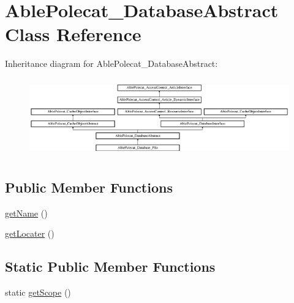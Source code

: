 \hypertarget{class_able_polecat___database_abstract}{}\section{Able\+Polecat\+\_\+\+Database\+Abstract Class Reference}
\label{class_able_polecat___database_abstract}
Inheritance diagram for Able\+Polecat\+\_\+\+Database\+Abstract\+:\begin{figure}[H]
\begin{center}
\leavevmode
\includegraphics[height=3.414634cm]{class_able_polecat___database_abstract}
\end{center}
\end{figure}
\subsection*{Public Member Functions}
\begin{DoxyCompactItemize}
\item 
\hyperlink{class_able_polecat___database_abstract_a3d0963e68bb313b163a73f2803c64600}{get\+Name} ()
\item 
\hyperlink{class_able_polecat___database_abstract_a66e49cc03d1511ec4c0290ffaa688079}{get\+Locater} ()
\end{DoxyCompactItemize}
\subsection*{Static Public Member Functions}
\begin{DoxyCompactItemize}
\item 
static \hyperlink{class_able_polecat___database_abstract_ad9ade868bd136d32967059d1cccb3e92}{get\+Scope} ()
\end{DoxyCompactItemize}
